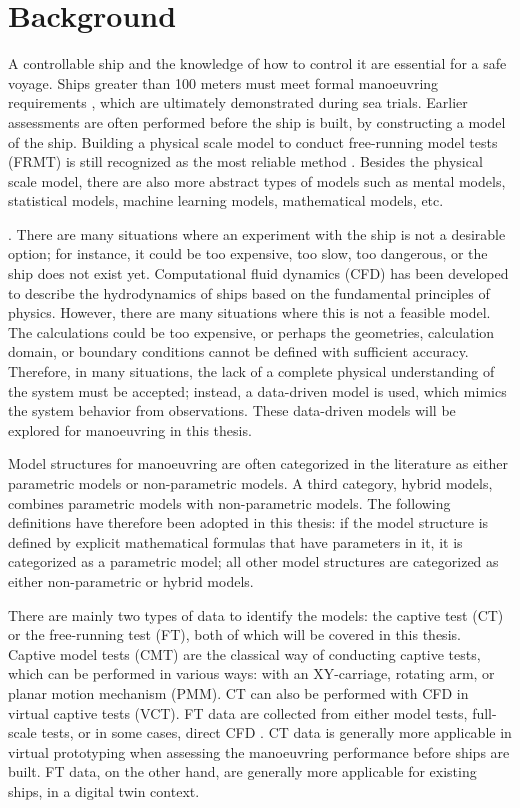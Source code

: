 \section{Background}
A controllable ship and the knowledge of how to control it are essential for a safe voyage. Ships greater than 100 meters must meet formal manoeuvring requirements \cite{imoStandardsShipManoeuvrability2002}, which are ultimately demonstrated during sea trials. Earlier assessments are often performed before the ship is built, by constructing a model of the ship. Building a physical scale model to conduct free-running model tests (FRMT) is still recognized as the most reliable method \cite{ittcManeuveringCommitteeITTC2008}. Besides the physical scale model, there are also more abstract types of models such as mental models, statistical models, machine learning models, mathematical models, etc.

 \cite{ljungModelingIdentificationDynamic2021}. There are many situations where an experiment with the ship is not a desirable option; for instance, it could be too expensive, too slow, too dangerous, or the ship does not exist yet. Computational fluid dynamics (CFD) has been developed to describe the hydrodynamics of ships based on the fundamental principles of physics. However, there are many situations where this is not a feasible model. The calculations could be too expensive, or perhaps the geometries, calculation domain, or boundary conditions cannot be defined with sufficient accuracy. Therefore, in many situations, the lack of a complete physical understanding of the system must be accepted; instead, a data-driven model is used, which mimics the system behavior from observations. These data-driven models will be explored for manoeuvring in this thesis.

Model structures for manoeuvring are often categorized in the literature as either parametric models or non-parametric models. A third category, hybrid models, combines parametric models with non-parametric models. The following definitions have therefore been adopted in this thesis: if the model structure is defined by explicit mathematical formulas that have parameters in it, it is categorized as a parametric model; all other model structures are categorized as either non-parametric or hybrid models.

There are mainly two types of data to identify the models: the captive test (CT) or the free-running test (FT), both of which will be covered in this thesis. Captive model tests (CMT) are the classical way of conducting captive tests, which can be performed in various ways: with an XY-carriage, rotating arm, or planar motion mechanism (PMM). CT can also be performed with CFD in virtual captive tests (VCT). FT data are collected from either model tests, full-scale tests, or in some cases, direct CFD \cite{arakiEstimatingManeuveringCoefficients2012}. CT data is generally more applicable in virtual prototyping when assessing the manoeuvring performance before ships are built. FT data, on the other hand, are generally more applicable for existing ships, in a digital twin context.


